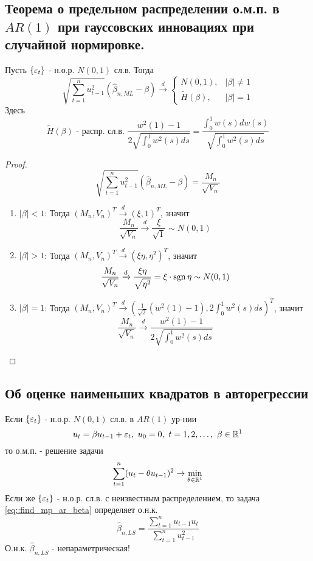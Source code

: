 \subsection{Теорема о предельном распределении о.м.п. в $AR(1)$ при гауссовских
инновациях при случайной нормировке.}
\begin{theorem}
    Пусть $\{\varepsilon_t\}$ - н.о.р. $N(0,1)$ сл.в. Тогда
    \[\sqrt{\sum_{t=1}^nu^2_{t-1}}(\widehat{\beta}_{n,ML}-\beta)\xrightarrow{d}\begin{cases}
        N(0,1),& \left\lvert \beta\right\rvert \neq1\\
        \widetilde{H}(\beta),& \left\lvert \beta\right\rvert =1
    \end{cases}\]
    Здесь
    \[\widetilde{H}(\beta)\text{ - распр. сл.в. }\frac{w^2(1)-1}{2\sqrt{\int_0^1w^2(s)ds}}=\frac{\int_0^1w(s)dw(s)}{\sqrt{\int^1_0w^2(s)ds}}\]
\end{theorem}
\begin{proof}
    \[\sqrt{\sum_{t=1}^nu^2_{t-1}}(\widehat{\beta}_{n,ML}-\beta)=\frac{M_n}{\sqrt{V_n}}\]
    \begin{enumerate}
        \item \underline{$\left\lvert \beta\right\rvert <1$}: Тогда $(M_n,V_n)^T\xrightarrow{d}(\xi,1)^T$, значит 
        \[\frac{M_n}{\sqrt{V_n}}\xrightarrow{d}\frac{\xi}{\sqrt{1}}\sim N(0,1)\]
        \item \underline{$\left\lvert \beta\right\rvert >1$}: Тогда $(M_n,V_n)^T\xrightarrow{d}(\xi\eta,\eta^2)^T$, значит 
        \[\frac{M_n}{\sqrt{V_n}}\xrightarrow{d}\frac{\xi\eta}{\sqrt{\eta^2}}=\xi\cdot \operatorname{sgn} \eta\sim N(0,1)\]
        \item \underline{$\left\lvert \beta\right\rvert =1$}: Тогда $(M_n,V_n)^T\xrightarrow{d}\left(\frac{1}{\sqrt{2}}(w^2(1)-1),2\int_0^1w^2(s)ds\right)^T$, значит 
        \[\frac{M_n}{\sqrt{V_n}}\xrightarrow{d}\frac{w^2(1)-1}{2\sqrt{\int_0^1w^2(s)ds}}\]
    \end{enumerate}
\end{proof}

\subsection{Об оценке наименьших квадратов в авторегрессии}
Если $\{\varepsilon_t\}$ - н.о.р. $N(0,1)$ сл.в. в $AR(1)$ ур-нии
\begin{equation}
    u_t=\beta u_{t-1}+\eps_t,\ u_0=0,\ t=1,2,\ldots,\ \beta\in\R^1
\end{equation}
то о.м.п. - решение задачи
\begin{equation} \label{eq::find_mp_ar_beta}
    \sum_{t=1}^n(u_t-\theta u_{t-1})^2\rightarrow\min_{\theta\in\mathbb{R}^1}
\end{equation}
Если же $\{\varepsilon_t\}$ - н.о.р. сл.в. с неизвестным распределением, то задача \eqref{eq::find_mp_ar_beta}
определяет о.н.к.
\[\widehat{\beta}_{n,LS}=\frac{\sum_{t=1}^nu_{t-1}u_{t}}{\sum_{t=1}^nu^2_{t-1}}\]
О.н.к. $\widehat{\beta}_{n,LS}$ - непараметрическая!


